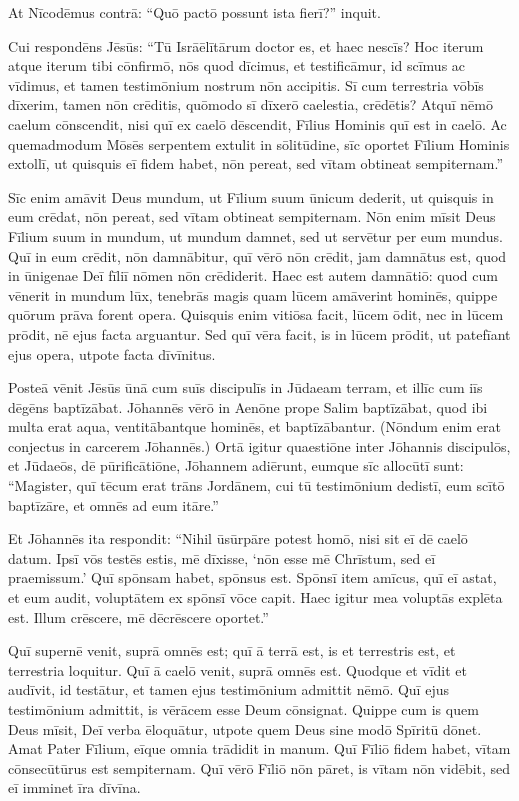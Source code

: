 \Versus At Nīcodēmus contrā: ``Quō pactō possunt ista fierī?'' inquit.

\Versus Cui respondēns Jēsūs: ``Tū Isrāēlītārum doctor es, et haec nescīs?
\Versus Hoc iterum atque iterum tibi cōnfirmō, nōs quod dīcimus, et testificāmur, id scīmus ac vīdimus, et tamen testimōnium nostrum nōn accipitis.
\Versus Sī cum terrestria vōbīs dīxerim, tamen nōn crēditis, quōmodo sī dīxerō caelestia, crēdētis?
\Versus Atquī nēmō caelum cōnscendit, nisi quī ex caelō dēscendit, Fīlius Hominis quī est in caelō.
\Versus Ac quemadmodum Mōsēs serpentem extulit in sōlitūdine, sīc oportet Fīlium Hominis extollī,
\Versus ut quisquis eī fidem habet, nōn pereat, sed vītam obtineat sempiternam.''

\Versus Sīc enim amāvit Deus mundum, ut Fīlium suum ūnicum dederit, ut quisquis in eum crēdat, nōn pereat, sed vītam obtineat sempiternam.
\Versus Nōn enim mīsit Deus Fīlium suum in mundum, ut mundum damnet, sed ut servētur per eum mundus.
\Versus Quī in eum crēdit, nōn damnābitur, quī vērō nōn crēdit, jam damnātus est, quod in ūnigenae Deī fīliī nōmen nōn crēdiderit.
\Versus Haec est autem damnātiō: quod cum vēnerit in mundum lūx, tenebrās magis quam lūcem amāverint hominēs, quippe quōrum prāva forent opera.
\Versus Quisquis enim vitiōsa facit, lūcem ōdit, nec in lūcem prōdit, nē ejus facta arguantur.
\Versus Sed quī vēra facit, is in lūcem prōdit, ut patefīant ejus opera, utpote facta dīvīnitus.

\Versus Posteā vēnit Jēsūs ūnā cum suīs discipulīs in Jūdaeam terram, et illīc cum iīs dēgēns baptīzābat.
\Versus Jōhannēs vērō in Aenōne prope Salim baptīzābat, quod ibi multa erat aqua, ventitābantque hominēs, et baptīzābantur.
\Versus (Nōndum enim erat conjectus in carcerem Jōhannēs.)
\Versus Ortā igitur quaestiōne inter Jōhannis discipulōs, et Jūdaeōs, dē pūrificātiōne,
\Versus Jōhannem adiērunt, eumque sīc allocūtī sunt: ``Magister, quī tēcum erat trāns Jordānem, cui tū testimōnium dedistī, eum scītō baptīzāre, et omnēs ad eum itāre.''

\Versus Et Jōhannēs ita respondit: ``Nihil ūsūrpāre potest homō, nisi sit eī dē caelō datum.
\Versus Ipsī vōs testēs estis, mē dīxisse, `nōn esse mē Chrīstum, sed eī praemissum.'
\Versus Quī spōnsam habet, spōnsus est. Spōnsī item amīcus, quī eī astat, et eum audit, voluptātem ex spōnsī vōce capit. Haec igitur mea voluptās explēta est.
\Versus Illum crēscere, mē dēcrēscere oportet.''

\Versus Quī supernē venit, suprā omnēs est; quī ā terrā est, is et terrestris est, et terrestria loquitur. Quī ā caelō venit, suprā omnēs est.
\Versus Quodque et vīdit et audīvit, id testātur, et tamen ejus testimōnium admittit nēmō.
\Versus Quī ejus testimōnium admittit, is vērācem esse Deum cōnsignat.
\Versus Quippe cum is quem Deus mīsit, Deī verba ēloquātur, utpote quem Deus sine modō Spīritū dōnet.
\Versus Amat Pater Fīlium, eīque omnia trādidit in manum.
\Versus Quī Fīliō fidem habet, vītam cōnsecūtūrus est sempiternam. Quī vērō Fīliō nōn pāret, is vītam nōn vidēbit, sed eī imminet īra dīvīna.

